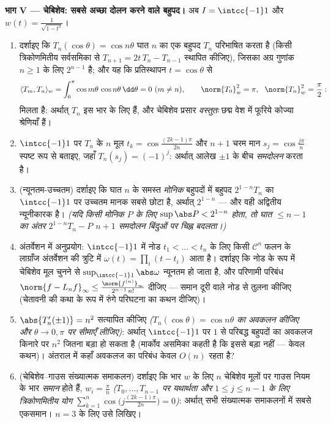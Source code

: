 \begin{problem}
\medskip
\noindent\textbf{भाग V --- चेबिशेव: सबसे अच्छा दोलन करने वाले
बहुपद।} अब $I = \intcc{-1}1$ और $w(t) =
\frac1{\sqrt{1 - t^2}}$।
\begin{enumerate}[resume]
  \item दर्शाइए कि $T_n(\cos\theta) = \cos n\theta$ घात $n$ का एक बहुपद $T_n$ परिभाषित
        करता है (किसी त्रिकोणमितीय सर्वसमिका से $T_{n+1} =
        2t\,T_n - T_{n-1}$ स्थापित
        कीजिए), जिसका अग्र गुणांक $n \geq 1$ के लिए $2^{n-1}$ है; और यह कि
        प्रतिस्थापन $t = \cos\theta$ से
        \[
        \langle T_m, T_n\rangle_w =
        \int_0^\pi\cos m\theta\,\cos n\theta\,\dd\theta
        = 0 \ (m \neq n), \qquad
        \norm{T_0}_w^2 = \pi,\ \ \norm{T_n}_w^2 = \frac\pi2 :
        \]
        मिलता है: अर्थात् $T_n$ इस भार के लिए  हैं,
        और चेबिशेव प्रसार \emph{वस्तुतः} छद्म वेश में फूरिये
        कोज्या श्रेणियाँ हैं।
  \item $\intcc{-1}1$ पर $T_n$ के $n$ मूल $t_k =
        \cos\frac{(2k-1)\pi}{2n}$ और $n + 1$ चरम मान $s_j = \cos\frac{j\pi}n$
        स्पष्ट रूप से बताइए, जहाँ $T_n(s_j) = (-1)^j$: अर्थात् आलेख $\pm1$ के बीच
        \emph{समदोलन} करता है।
  \item (न्यूनतम-उच्चतम) दर्शाइए कि घात $n$ के समस्त
        \emph{मोनिक} बहुपदों में बहुपद $2^{1-n}T_n$ का $\intcc{-1}1$ पर उच्चतम
        मानक सबसे छोटा है, अर्थात् $2^{1-n}$ --- और वही अद्वितीय
        न्यूनीकारक है। \emph{(यदि किसी मोनिक $P$ के लिए $\sup\abs P < 2^{1-n}$
        होता, तो घात $\leq n-1$ का अंतर $2^{1-n}T_n -
        P$ $n+1$ समदोलन बिंदुओं पर
        चिह्न बदलता।)}
  \item अंतर्वेशन में अनुप्रयोग: $\intcc{-1}1$ में नोड $t_1 < \dots
        < t_n$ के लिए किसी
        $\mathcal C^n$ फलन के लाग्राँज अंतर्वेशन की त्रुटि में $\omega(t) = \prod_i(t - t_i)$ आता
        है। दर्शाइए कि नोड के रूप में चेबिशेव मूल चुनने से $\sup_{\intcc{-1}1}\abs\omega$
        न्यूनतम हो जाता है, और परिणामी परिबंध $\norm{f -
        L_nf}_\infty \leq \frac{\norm{f^{(n)}}_\infty}
        {2^{n-1}\,n!}$ दीजिए ---
        समान दूरी वाले नोड से तुलना कीजिए (चेतावनी की कथा के रूप
        में रुंगे परिघटना का कथन दीजिए)।
  \item $\abs{T_n'(\pm1)} = n^2$ सत्यापित कीजिए \emph{($T_n(\cos\theta) = \cos n\theta$ का अवकलन कीजिए और
        $\theta \to 0, \pi$ पर सीमाएँ लीजिए)}: अर्थात् $\intcc{-1}1$ पर $1$ से परिबद्ध
        बहुपदों का अवकलज किनारे पर $n^2$ जितना बड़ा हो सकता है
        (मार्कोव असमिका कहती है कि इससे बड़ा नहीं --- केवल कथन)।
        अंतराल में कहाँ अवकलज का परिबंध केवल $O(n)$ रहता है?
  \item (चेबिशेव--गाउस संख्यात्मक समाकलन) दर्शाइए कि भार $w$ के
        लिए $n$ चेबिशेव मूलों पर गाउस नियम के भार \emph{समान}
        होते हैं, $w_i = \frac\pi n$ \emph{($T_0, \dots, T_{n-1}$ पर यथार्थता और $1 \leq j \leq n - 1$ के लिए
        त्रिकोणमितीय योग $\sum_{k=1}^n\cos\bigl(j\tfrac{(2k-1)\pi}{2n}\bigr) =
        0$)}: अर्थात् सभी संख्यात्मक समाकलनों
        में सबसे एकसमान। $n = 3$ के लिए उसे लिखिए।
\end{enumerate}


\end{problem}
